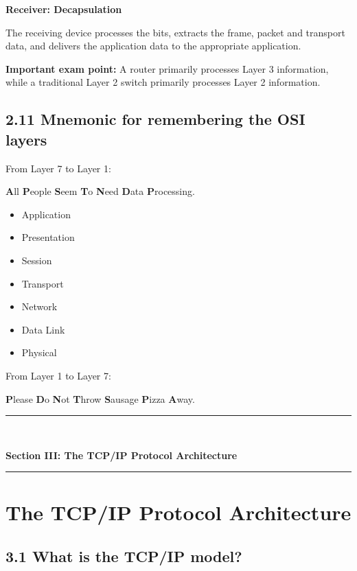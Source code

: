 \textbf{Receiver: Decapsulation}

The receiving device processes the bits, extracts the frame, packet and transport data, and delivers the application data to the appropriate application.

\textbf{Important exam point:} A router primarily processes Layer 3 information, while a traditional Layer 2 switch primarily processes Layer 2 information.

\subsection{2.11 Mnemonic for remembering the OSI layers}

From Layer 7 to Layer 1:

\textbf{A}ll \textbf{P}eople \textbf{S}eem \textbf{T}o \textbf{N}eed \textbf{D}ata \textbf{P}rocessing.

\begin{itemize}
    \item Application
    \item Presentation
    \item Session
    \item Transport
    \item Network
    \item Data Link
    \item Physical
\end{itemize}

From Layer 1 to Layer 7:

\textbf{P}lease \textbf{D}o \textbf{N}ot \textbf{T}hrow \textbf{S}ausage \textbf{P}izza \textbf{A}way.


\newpage

\newpage
\begin{center}
\vspace{0.5em}
{\color{primary}\rule{0.45\textwidth}{1.2pt}\\[4pt]}
{\Large\bfseries\color{primary} Section III: The TCP/IP Protocol Architecture\\[2pt]}
{\color{primary}\rule{0.45\textwidth}{1.2pt}}
\vspace{0.5em}
\end{center}

\section{The TCP/IP Protocol Architecture}

\subsection{3.1 What is the TCP/IP model?}


